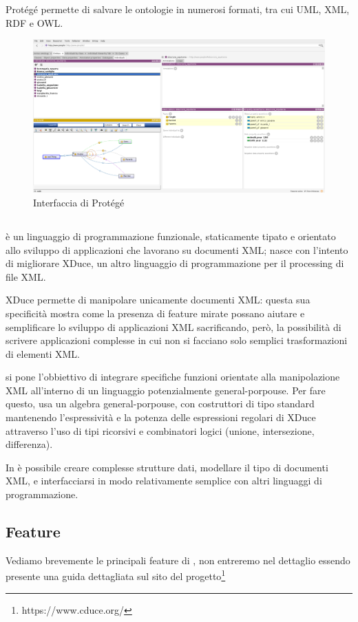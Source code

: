 Protégé permette di salvare le ontologie in numerosi formati, tra cui UML, XML, RDF e OWL.
\begin{figure}[h]
	\centering
	\includegraphics[width=\textwidth]{Picture/interface_protege.png}
	\caption{Interfaccia di Protégé}
\end{figure}
\subsection{\cduce}
\cduce è un linguaggio di programmazione funzionale, staticamente tipato e orientato allo sviluppo di applicazioni che lavorano su documenti XML\cite{cduceLanguage}; nasce con l'intento di migliorare XDuce, un altro linguaggio di programmazione per il processing di file XML\cite{hosoya2003xduce}. 

XDuce permette di manipolare unicamente documenti XML: questa sua specificità mostra come la presenza di feature mirate possano aiutare e semplificare lo sviluppo di applicazioni XML sacrificando, però, la possibilità di scrivere applicazioni complesse in cui non si facciano solo semplici trasformazioni di elementi XML.

\cduce si pone l'obbiettivo di integrare specifiche funzioni orientate alla manipolazione XML all'interno di un linguaggio potenzialmente general-porpouse. Per fare questo, \cduce usa un algebra general-porpouse, con costruttori di tipo standard mantenendo l'espressività e la potenza delle espressioni regolari di XDuce attraverso l'uso di tipi ricorsivi e combinatori logici (unione, intersezione, differenza).

In \cduce è possibile creare complesse strutture dati, modellare il tipo di documenti XML, e interfacciarsi in modo relativamente semplice con altri linguaggi di programmazione\cite{cduceLanguage}.
\subsection{Feature}\label{fature_cduce}
Vediamo brevemente le principali feature di \cduce, non entreremo nel dettaglio essendo presente una guida dettagliata sul sito del progetto\footnote{https://www.cduce.org/}

